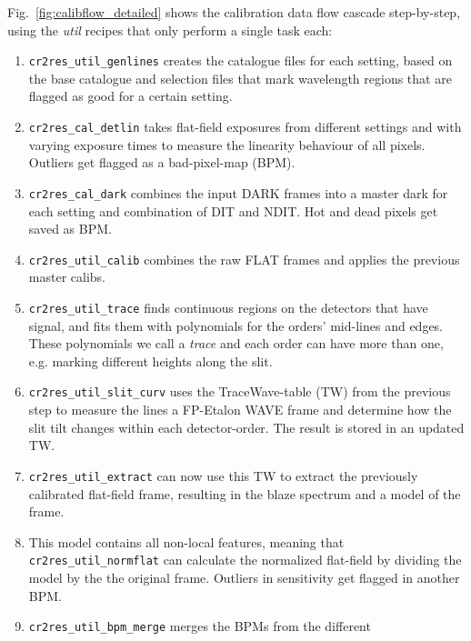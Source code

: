 Fig.~\ref{fig:calibflow_detailed} shows the calibration data flow cascade
step-by-step, using the \emph{util} recipes that only perform a single task
each:
\begin{enumerate}
    \item \texttt{cr2res\_util\_genlines} creates the catalogue files for each
          setting,
          based on the base catalogue and selection files that mark wavelength
          regions
          that are flagged as good for a certain setting.
    \item \texttt{cr2res\_cal\_detlin} takes flat-field exposures from
          different settings and with varying exposure times to measure the
          linearity
          behaviour of all pixels. Outliers get flagged as a bad-pixel-map
          (BPM).
    \item \texttt{cr2res\_cal\_dark} combines the input DARK frames into a
          master dark for
          each setting and combination of DIT and NDIT. Hot and dead pixels get
          saved as BPM.
    \item \texttt{cr2res\_util\_calib} combines the raw FLAT frames and applies
          the	       previous master calibs.
    \item \texttt{cr2res\_util\_trace} finds continuous regions on the
          detectors that
          have signal, and fits them with polynomials for the orders' mid-lines
          and edges.
          These polynomials we call a \emph{trace} and each order can have more
          than one,
          e.g. marking different heights along the slit.
    \item \texttt{cr2res\_util\_slit\_curv} uses the TraceWave-table (TW) from
          the previous
          step to measure the lines a FP-Etalon WAVE frame and determine how
          the
          slit tilt
          changes within each detector-order. The result is stored in an
          updated
          TW.
    \item \texttt{cr2res\_util\_extract} can now use this TW to extract the
          previously
          calibrated flat-field frame, resulting in the blaze spectrum and a
          model of
          the frame.
    \item This model contains all non-local features, meaning that
          \texttt{cr2res\_util\_normflat} can calculate the normalized
          flat-field
          by
          dividing the model by the the original frame. Outliers in sensitivity
          get
          flagged in another BPM.
    \item \texttt{cr2res\_util\_bpm\_merge} merges the BPMs from the different

\end{enumerate}
